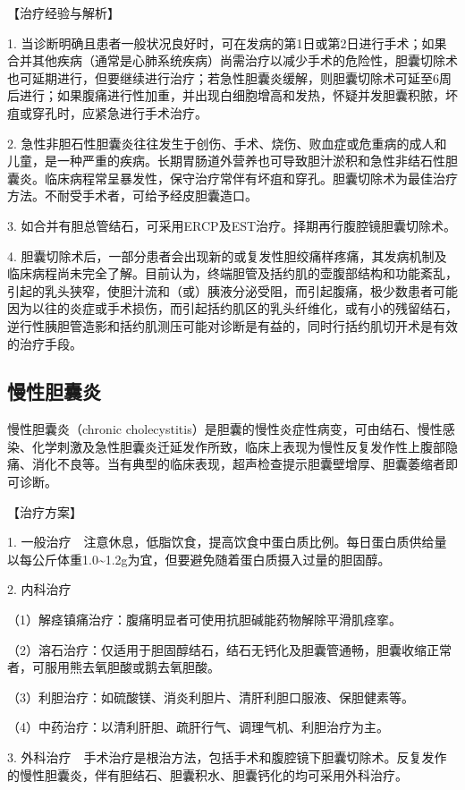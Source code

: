 【治疗经验与解析】

1.
当诊断明确且患者一般状况良好时，可在发病的第1日或第2日进行手术；如果合并其他疾病（通常是心肺系统疾病）尚需治疗以减少手术的危险性，胆囊切除术也可延期进行，但要继续进行治疗；若急性胆囊炎缓解，则胆囊切除术可延至6周后进行；如果腹痛进行性加重，并出现白细胞增高和发热，怀疑并发胆囊积脓，坏疽或穿孔时，应紧急进行手术治疗。

2.
急性非胆石性胆囊炎往往发生于创伤、手术、烧伤、败血症或危重病的成人和儿童，是一种严重的疾病。长期胃肠道外营养也可导致胆汁淤积和急性非结石性胆囊炎。临床病程常呈暴发性，保守治疗常伴有坏疽和穿孔。胆囊切除术为最佳治疗方法。不耐受手术者，可给予经皮胆囊造口。

3. 如合并有胆总管结石，可采用ERCP及EST治疗。择期再行腹腔镜胆囊切除术。

4.
胆囊切除术后，一部分患者会出现新的或复发性胆绞痛样疼痛，其发病机制及临床病程尚未完全了解。目前认为，终端胆管及括约肌的壶腹部结构和功能紊乱，引起的乳头狭窄，使胆汁流和（或）胰液分泌受阻，而引起腹痛，极少数患者可能因为以往的炎症或手术损伤，而引起括约肌区的乳头纤维化，或有小的残留结石，逆行性胰胆管造影和括约肌测压可能对诊断是有益的，同时行括约肌切开术是有效的治疗手段。

\subsection{慢性胆囊炎}

慢性胆囊炎（chronic
cholecystitis）是胆囊的慢性炎症性病变，可由结石、慢性感染、化学刺激及急性胆囊炎迁延发作所致，临床上表现为慢性反复发作性上腹部隐痛、消化不良等。当有典型的临床表现，超声检查提示胆囊壁增厚、胆囊萎缩者即可诊断。

【治疗方案】

1.
一般治疗　注意休息，低脂饮食，提高饮食中蛋白质比例。每日蛋白质供给量以每公斤体重1.0\textasciitilde{}1.2g为宜，但要避免随着蛋白质摄入过量的胆固醇。

2. 内科治疗

（1）解痉镇痛治疗：腹痛明显者可使用抗胆碱能药物解除平滑肌痉挛。

（2）溶石治疗：仅适用于胆固醇结石，结石无钙化及胆囊管通畅，胆囊收缩正常者，可服用熊去氧胆酸或鹅去氧胆酸。

（3）利胆治疗：如硫酸镁、消炎利胆片、清肝利胆口服液、保胆健素等。

（4）中药治疗：以清利肝胆、疏肝行气、调理气机、利胆治疗为主。

3.
外科治疗　手术治疗是根治方法，包括手术和腹腔镜下胆囊切除术。反复发作的慢性胆囊炎，伴有胆结石、胆囊积水、胆囊钙化的均可采用外科治疗。

